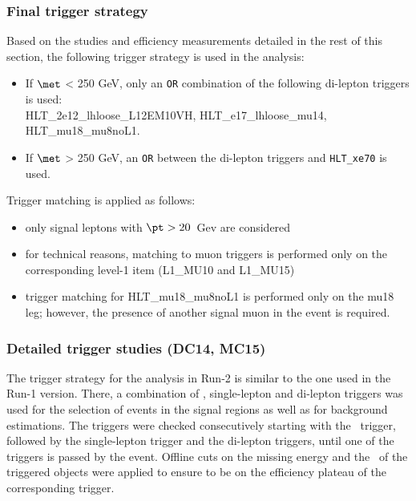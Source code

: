 
\subsubsection{Final trigger strategy}

Based on the studies and efficiency measurements detailed in the rest of this section, the following trigger strategy is used in the analysis:

\begin{itemize}

\item If $\met$ < 250 GeV, only an \texttt{OR} combination of the following di-lepton triggers is used: \\HLT\_2e12\_lhloose\_L12EM10VH, HLT\_e17\_lhloose\_mu14, HLT\_mu18\_mu8noL1.

\item If $\met$ > 250 GeV, an \texttt{OR} between the di-lepton triggers and \texttt{HLT\_xe70} is used.

\end{itemize}

Trigger matching is applied as follows:
\begin{itemize}
\item only signal leptons with $\pt>20$~Gev are considered
\item for technical reasons, matching to muon triggers is performed only on the corresponding level-1 item (L1\_MU10 and L1\_MU15)
\item trigger matching for HLT\_mu18\_mu8noL1 is performed only on the mu18 leg; however, the presence of another signal muon in the event is required. 
\end{itemize}

\subsubsection{Detailed trigger studies (DC14, MC15)}

The trigger strategy for the analysis in Run-2 is similar to the one used in the Run-1 version. There, a combination of \met, single-lepton and di-lepton triggers was used for the selection of events in the signal regions as well as for background estimations. The triggers were checked consecutively starting with the \met\ trigger, followed by the single-lepton trigger and the di-lepton triggers, until one of the triggers is passed by the event. Offline cuts on the missing energy and the \pt\ of the triggered objects were applied to ensure to be on the efficiency plateau of the corresponding trigger.

